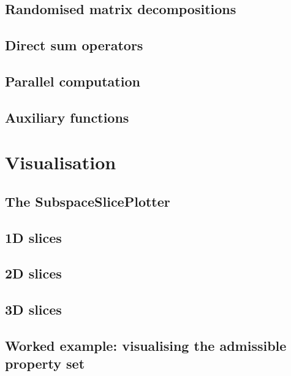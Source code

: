 \documentclass[11pt,twoside,openright]{book}
\theoremstyle{plain}
\theoremstyle{definition}
\theoremstyle{remark}
\begin{document}
\section{Randomised matrix decompositions}
\label{sec:randomised}

\section{Direct sum operators}
\label{sec:direct-sum-operators}

\section{Parallel computation}
\label{sec:parallel}

\section{Auxiliary functions}
\label{sec:auxiliary}


\chapter{Visualisation}
\label{ch:visualisation}

\section{The SubspaceSlicePlotter}
\label{sec:slice-plotter}

\section{1D slices}
\label{sec:1d-slices}

\section{2D slices}
\label{sec:2d-slices}

\section{3D slices}
\label{sec:3d-slices}

\section{Worked example: visualising the admissible property set}
\label{sec:vis-example}
\end{document}

